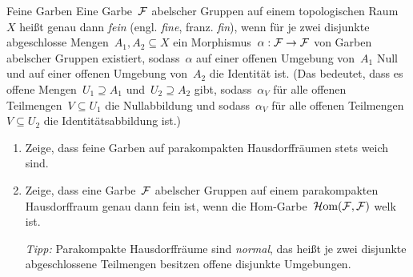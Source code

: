 \documentclass{uebblatt}
\begin{document}
\begin{aufgabe}{Feine Garben}
Eine Garbe~$\mathcal{F}$ abelscher Gruppen auf einem topologischen Raum~$X$ heißt genau dann \emph{fein}
(engl. \emph{fine}, franz. \emph{fin}), wenn für je zwei disjunkte abgeschlosse
Mengen~$A_1, A_2 \subseteq X$ ein Morphismus~$\alpha : \mathcal{F} \to \mathcal{F}$ von Garben
abelscher Gruppen existiert, sodass~$\alpha$ auf einer offenen Umgebung
von~$A_1$ Null und auf einer offenen Umgebung von~$A_2$ die Identität ist.
(Das bedeutet, dass es offene Mengen~$U_1 \supseteq A_1$
und~$U_2 \supseteq A_2$ gibt, sodass~$\alpha_V$ für alle offenen Teilmengen~$V
\subseteq U_1$ die Nullabbildung und sodass~$\alpha_V$ für alle offenen
Teilmengen~$V \subseteq U_2$ die Identitätsabbildung ist.)

\begin{enumerate}
\item Zeige, dass feine Garben auf parakompakten Hausdorffräumen stets weich
sind.
\item Zeige, dass eine Garbe~$\mathcal{F}$ abelscher Gruppen auf einem parakompakten
Hausdorffraum genau dann fein ist, wenn die Hom-Garbe~$\mathcal{H}\mathrm{om}(\mathcal{F},\mathcal{F})$ welk ist.

{\tiny
\emph{Tipp:} Parakompakte Hausdorffräume sind \emph{normal}, das heißt
je zwei disjunkte abgeschlossene Teilmengen besitzen offene disjunkte
Umgebungen.\par}
\end{enumerate}
\end{aufgabe}
\end{document}
